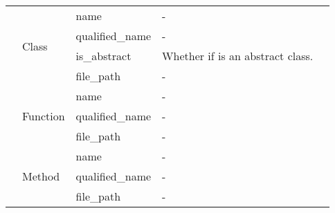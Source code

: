 \begin{tabular}{|p{1.6cm}|p{1.7cm}|p{2cm}|p{3.3cm}|p{7.5cm}|}
\cline{2-2}\cline{3-3}\cline{4-4}\cline{5-5}
 & \multirow{4}{*}{Class} & name & - &  \\
\cline{3-3}\cline{4-4}\cline{5-5}
 &  & qualified\_name & - &  \\
\cline{3-3}\cline{4-4}\cline{5-5}
 &  & is\_abstract & Whether if is an abstract class. &  \\
\cline{3-3}\cline{4-4}\cline{5-5}
 &  & file\_path & - &  \\
\cline{2-2}\cline{3-3}\cline{4-4}\cline{5-5}
 & \multirow{3}{*}{Function} & name & - &  \\
\cline{3-3}\cline{4-4}\cline{5-5}
 &  & qualified\_name & - &  \\
\cline{3-3}\cline{4-4}\cline{5-5}
 &  & file\_path & - &  \\
\cline{2-2}\cline{3-3}\cline{4-4}\cline{5-5}
 & \multirow{3}{*}{Method} & name & - &  \\
\cline{3-3}\cline{4-4}\cline{5-5}
 &  & qualified\_name & - &  \\
\cline{3-3}\cline{4-4}\cline{5-5}
 &  & file\_path & - &  \\
\cline{1-1}\cline{2-2}\cline{3-3}\cline{4-4}\cline{5-5}
\hline
\end{tabular}